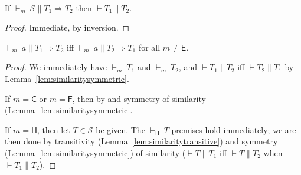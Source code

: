 \documentclass[9pt]{extarticle}
\newcommand{\ottnt}[1]{\mathit{#1}}
\newcommand{\ottsym}[1]{#1}
\begin{document}
\begin{lemma}
  \label{lem:typesetsimilar}
  ~

  \noindent
  If $ \mathord{  \vdash _{ \ottnt{m} } }~ \mathcal{S}   \mathrel{\parallel}   \ottnt{T_{{\mathrm{1}}}}  \Rightarrow  \ottnt{T_{{\mathrm{2}}}} $ then $\vdash  \ottnt{T_{{\mathrm{1}}}}  \mathrel{\parallel}  \ottnt{T_{{\mathrm{2}}}}$.
\begin{proof}
    Immediate, by inversion.
  \end{proof}  
\end{lemma}

\begin{lemma}
  \label{lem:typesetsymmetric}
  $ \mathord{  \vdash _{ \ottnt{m} } }~ \ottnt{a}   \mathrel{\parallel}   \ottnt{T_{{\mathrm{1}}}}  \Rightarrow  \ottnt{T_{{\mathrm{2}}}} $ iff $ \mathord{  \vdash _{ \ottnt{m} } }~ \ottnt{a}   \mathrel{\parallel}   \ottnt{T_{{\mathrm{2}}}}  \Rightarrow  \ottnt{T_{{\mathrm{1}}}} $ for all $\ottnt{m}  \neq   \mathsf{E} $.
\begin{proof}
    We immediately have $ \mathord{  \vdash _{ \ottnt{m} } }~ \ottnt{T_{{\mathrm{1}}}} $ and $ \mathord{  \vdash _{ \ottnt{m} } }~ \ottnt{T_{{\mathrm{2}}}} $, and $\vdash  \ottnt{T_{{\mathrm{1}}}}  \mathrel{\parallel}  \ottnt{T_{{\mathrm{2}}}}$ iff $\vdash  \ottnt{T_{{\mathrm{2}}}}  \mathrel{\parallel}  \ottnt{T_{{\mathrm{1}}}}$ by
    Lemma~\ref{lem:similaritysymmetric}.

    If $\ottnt{m}  \ottsym{=}   \mathsf{C} $ or $\ottnt{m}  \ottsym{=}   \mathsf{F} $, then by  and symmetry of
    similarity (Lemma~\ref{lem:similaritysymmetric}.

    If $\ottnt{m}  \ottsym{=}   \mathsf{H} $, then let $ \ottnt{T}  \in  \mathcal{S} $ be given. The $ \mathord{  \vdash _{  \mathsf{H}  } }~ \ottnt{T} $
    premises hold immediately; we are then done by transitivity
    (Lemma~\ref{lem:similaritytransitive}) and symmetry
    (Lemma~\ref{lem:similaritysymmetric}) of similarity ($\vdash  \ottnt{T}  \mathrel{\parallel}  \ottnt{T_{{\mathrm{1}}}}$ iff $\vdash  \ottnt{T}  \mathrel{\parallel}  \ottnt{T_{{\mathrm{2}}}}$ when $\vdash  \ottnt{T_{{\mathrm{1}}}}  \mathrel{\parallel}  \ottnt{T_{{\mathrm{2}}}}$).
  \end{proof}  
\end{lemma}
\end{document}
